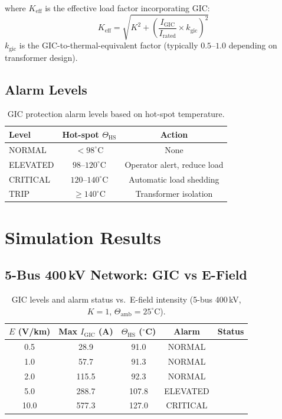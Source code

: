 \documentclass[11pt, a4paper]{article}
\newcommand{\cmark}{\ding{51}}
\begin{document}
\noindent where $K_{\mathrm{eff}}$ is the effective load factor incorporating GIC:
\begin{equation}
  K_{\mathrm{eff}} = \sqrt{K^2 + \left(\frac{I_{\mathrm{GIC}}}{I_{\mathrm{rated}}}
    \times k_{\mathrm{gic}}\right)^2}
  \label{eq:keff}
\end{equation}
$k_{\mathrm{gic}}$ is the GIC-to-thermal-equivalent factor
(typically $0.5$--$1.0$ depending on transformer design).

\subsection{Alarm Levels}

\begin{table}[ht]
\centering
\caption{GIC protection alarm levels based on hot-spot temperature.}
\label{tab:alarms}
\begin{tabular}{lcc}
\toprule
Level & Hot-spot $\Theta_{\mathrm{HS}}$ & Action \\
\midrule
NORMAL   & $< 98^\circ$C & None \\
ELEVATED & $98$--$120^\circ$C & Operator alert, reduce load \\
CRITICAL & $120$--$140^\circ$C & Automatic load shedding \\
TRIP     & $\geq 140^\circ$C & Transformer isolation \\
\bottomrule
\end{tabular}
\end{table}

\section{Simulation Results}
\label{sec:results}

\subsection{5-Bus 400\,kV Network: GIC vs E-Field}

\begin{table}[ht]
\centering
\caption{GIC levels and alarm status vs.\ E-field intensity
  (5-bus 400\,kV, $K=1$, $\Theta_{\mathrm{amb}}=25^\circ$C).}
\label{tab:gic}
\begin{tabular}{ccccc}
\toprule
$E$ (V/km) & Max $I_{\mathrm{GIC}}$ (A) & $\Theta_{\mathrm{HS}}$ ($^\circ$C) & Alarm & Status \\
\midrule
0.5 &  28.9 & 91.0  & NORMAL   & \cmark \\
1.0 &  57.7 & 91.3  & NORMAL   & \cmark \\
2.0 & 115.5 & 92.3  & NORMAL   & \cmark \\
5.0 & 288.7 & 107.8 & ELEVATED & \cmark \\
10.0 & 577.3 & 127.0 & CRITICAL & \cmark \\
\bottomrule
\end{tabular}
\end{table}
\end{document}

